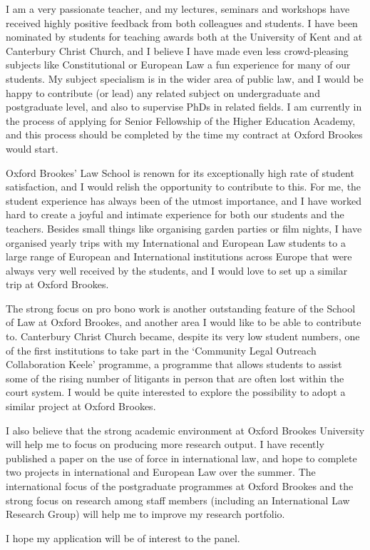 \documentclass[11pt,a4paper]{moderncv}
\begin{document}
I am a very passionate teacher, and my lectures, seminars and workshops have received highly positive feedback from both colleagues and students. I have been nominated by students for teaching awards both at the University of Kent and at Canterbury Christ Church, and I believe I have made even less crowd-pleasing subjects like Constitutional or European Law a fun experience for many of our students. My subject specialism is in the wider area of public law, and I would be happy to contribute (or lead) any related subject on undergraduate and postgraduate level, and also to supervise PhDs in related fields. I am currently in the process of applying for Senior Fellowship of the Higher Education Academy, and this process should be completed by the time my contract at Oxford Brookes would start.

Oxford Brookes' Law School is renown for its exceptionally high rate of student satisfaction, and I would relish the opportunity to contribute to this. For me, the student experience has always been of the utmost importance, and I have worked hard to create a joyful and intimate experience for both our students and the teachers. Besides small things like organising garden parties or film nights, I have organised yearly trips with my International and European Law students to a large range of European and International institutions across Europe that were always very well received by the students, and I would love to set up a similar trip at Oxford Brookes.

The strong focus on pro bono work is another outstanding feature of the School of Law at Oxford Brookes, and another area I would like to be able to contribute to. Canterbury Christ Church became, despite its very low student numbers, one of the first institutions to take part in the `Community Legal Outreach Collaboration Keele' programme, a programme that allows students to assist some of the rising number of litigants in person that are often lost within the court system. I would be quite interested to explore the possibility to adopt a similar project at Oxford Brookes.

I also believe that the strong academic environment at Oxford Brookes University will help me to focus on producing more research output. I have recently published a paper on the use of force in international law, and hope to complete two projects in international and European Law over the summer. The international focus of the postgraduate programmes at Oxford Brookes and the strong focus on research among staff members (including an International Law Research Group) will help me to improve my research portfolio.

I hope my application will be of interest to the panel.

\makeletterclosing
\end{document}

